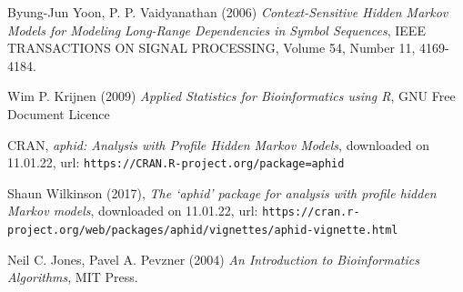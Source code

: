 \documentclass{article}\usepackage[]{graphicx}\usepackage[]{color}
\begin{document}
\begin{thebibliography}{20}
Byung-Jun Yoon, P. P. Vaidyanathan (2006) \emph{Context-Sensitive Hidden Markov Models for Modeling Long-Range Dependencies in Symbol Sequences}, IEEE TRANSACTIONS ON SIGNAL PROCESSING, Volume 54, Number 11, 4169-4184.

Wim P. Krijnen (2009) \emph{Applied Statistics for Bioinformatics using R}, GNU Free Document Licence

CRAN, \emph{aphid: Analysis with Profile Hidden Markov Models}, downloaded on 11.01.22, 
url: \verb$https://CRAN.R-project.org/package=aphid$

Shaun Wilkinson (2017), \emph{The ‘aphid’ package for analysis with profile hidden Markov models}, downloaded on 11.01.22, 
url: \verb$https://cran.r-project.org/web/packages/aphid/vignettes/aphid-vignette.html$

Neil C. Jones, Pavel A. Pevzner (2004) \emph{An Introduction to Bioinformatics Algorithms}, MIT Press. 

\end{thebibliography}
\end{document}
